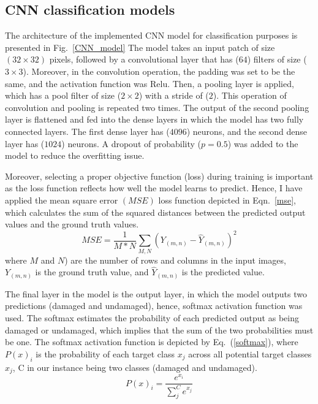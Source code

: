 \subsection{CNN classification models}
\label{sec422}
The architecture of the implemented CNN model for classification purposes is presented in Fig.~\ref{CNN_model}
The model takes an input patch of size \((32\times 32)\) pixels, followed by a convolutional layer that has (\(64\)) filters of size (\(3\times 3\)).
Moreover, in the convolution operation, the padding was set to be the same,  and the activation function was Relu.
Then, a pooling layer is applied, which has a pool filter of size (\(2\times 2\)) with a stride of (\(2\)).
This operation of convolution and pooling is repeated two times.
The output of the second pooling layer is flattened and fed into the dense layers in which the model has two fully connected layers.
The first dense layer has (\(4096\)) neurons, and the second dense layer has (\(1024\)) neurons.
A dropout of probability (\(p = 0.5\)) was added to the model to reduce the overfitting issue.

Moreover, selecting a proper objective function (loss) during training is important as the loss function reflects how well the model learns to predict.
Hence, I have applied the mean square error \((MSE)\) loss function depicted in Eqn.~\ref{mse}, which calculates the sum of the squared distances between the predicted output values and the ground truth values.
\begin{equation}
	MSE=\frac{1}{M*N}\sum_{M,N}^{}(Y_{(m,n)}-\hat{Y}_{(m,n)})^2
	\label{mse}
\end{equation}
where \(M\) and \(N\)) are the number of rows and columns in the input images, \(Y_{(m,n)}\) is the ground truth value, and \(\hat{Y}_{(m,n)}\) is the predicted value.

The final layer in the model is the output layer, in which the model outputs two predictions (damaged and undamaged), hence, softmax activation function was used.
The softmax estimates the probability of each predicted output as being damaged or undamaged, which implies that the sum of the two probabilities must be one.
The softmax activation function is depicted by Eq.~(\ref{softmax}), where \(P(x)_{i}\) is the probability of each target class \(x_{j}\) across all potential target classes \(x_{j}\), C in our instance being two classes (damaged and undamaged).
\begin{equation}
	P(x)_{i} = \frac{e^{x_{i}}}{\sum_{j}^{C} e^{x_{j}}}
	\label{softmax}
\end{equation} 

